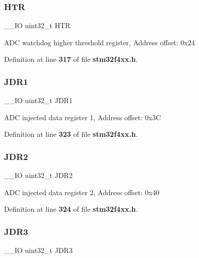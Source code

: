 \mbox{\label{structADC__TypeDef_a24c3512abcc90ef75cf3e9145e5dbe9b}} 
\subsubsection{H\+TR}
{\footnotesize\ttfamily \+\_\+\+\_\+\+IO uint32\+\_\+t H\+TR}

A\+DC watchdog higher threshold register, Address offset\+: 0x24 

Definition at line \textbf{ 317} of file \textbf{ stm32f4xx.\+h}.

\mbox{\label{structADC__TypeDef_a22fa21352be442bd02f9c26a1013d598}} 
\subsubsection{J\+D\+R1}
{\footnotesize\ttfamily \+\_\+\+\_\+\+IO uint32\+\_\+t J\+D\+R1}

A\+DC injected data register 1, Address offset\+: 0x3C 

Definition at line \textbf{ 323} of file \textbf{ stm32f4xx.\+h}.

\mbox{\label{structADC__TypeDef_ae9156af81694b7a85923348be45a2167}} 
\subsubsection{J\+D\+R2}
{\footnotesize\ttfamily \+\_\+\+\_\+\+IO uint32\+\_\+t J\+D\+R2}

A\+DC injected data register 2, Address offset\+: 0x40 

Definition at line \textbf{ 324} of file \textbf{ stm32f4xx.\+h}.

\mbox{\label{structADC__TypeDef_a3a54028253a75a470fccf841178cba46}} 
\subsubsection{J\+D\+R3}
{\footnotesize\ttfamily \+\_\+\+\_\+\+IO uint32\+\_\+t J\+D\+R3}

